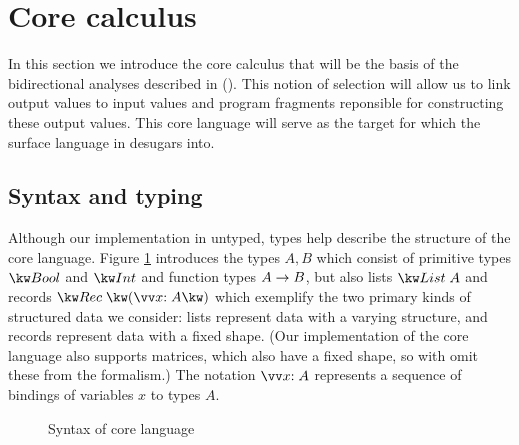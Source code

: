 \section{Core calculus}
\label{sec:core-language}

In this section we introduce the core calculus that will be the basis of the bidirectional analyses described in (). This notion of selection will allow us to link output values to input values and program fragments reponsible for constructing these output values. This core language will serve as the target for which the surface language in  desugars into.

\subsection{Syntax and typing}
\label{sec:core-language:syntax-typing}

Although our implementation in untyped, types help describe the structure of the core language.
Figure \ref{fig:core-language:syntax} introduces the types $A, B$ which consist of primitive types $\tyBool$ and $\tyInt$ and function types ${A}\rightarrow{B}$, but also lists $\tyList{A}$ and records $\tyRec{\vec{\bind{x}{A}}}$ which exemplify the two primary kinds of structured data we consider: lists represent data with a varying structure, and records represent data with a fixed shape. (Our implementation of the core language also supports matrices, which also have a fixed shape, so with omit these from the formalism.) The notation $\seq{\bind{x}{A}}$ represents a sequence of bindings of variables $x$ to types $A$.



\begin{figure}
   \begin{syntaxfig}
      
      
   \end{syntaxfig}
   \caption{Syntax of core language}
   \label{fig:core-language:syntax}
\end{figure}


